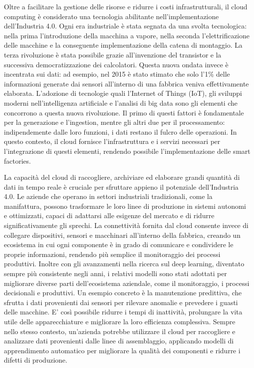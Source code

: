 Oltre a facilitare la gestione delle risorse e ridurre i costi infrastrutturali, il cloud computing è considerato una tecnologia abilitante nell'implementazione dell’Industria 4.0. Ogni era industriale è stata segnata da una svolta tecnologica: nella prima l'introduzione della macchina a vapore, nella seconda l'elettrificazione delle macchine e la conseguente implementazione della catena di montaggio. La terza rivoluzione è stata possibile grazie all'invenzione del transistor e la successiva democratizzazione dei calcolatori. Questa nuova ondata invece è incentrata sui dati: ad esempio, nel 2015 è stato stimato che solo l'1\% delle informazioni generate dai sensori all'interno di una fabbrica veniva effettivamente elaborata\cite{a6mckinsey}.  L’adozione di tecnologie quali l’Internet of Things (IoT), gli sviluppi moderni nell'intelligenza artificiale e l’analisi di big data sono gli elementi che concorrono a questa nuova rivoluzione. Il primo di questi fattori è fondamentale per la generazione e l'ingestion, mentre gli altri due per il processamento: indipendemente dalle loro funzioni, i dati restano il fulcro delle operazioni. In questo contesto, il cloud fornisce l'infrastruttura e i servizi necessari per l'integrazione di questi elementi, rendendo possibile l'implementazione delle smart factories. 

La capacità del cloud di raccogliere, archiviare ed elaborare grandi quantità di dati in tempo reale è cruciale per sfruttare appieno il potenziale dell’Industria 4.0. Le aziende che operano in settori industriali tradizionali, come la manifattura, possono trasformare le loro linee di produzione in sistemi autonomi e ottimizzati, capaci di adattarsi alle esigenze del mercato e di ridurre significativamente gli sprechi. La connettività fornita dal cloud consente invece di collegare dispositivi, sensori e macchinari all'interno della fabbrica, creando un ecosistema in cui ogni componente è in grado di comunicare e condividere le proprie informazioni, rendendo più semplice il monitoraggio dei processi produttivi. Inoltre con gli avanzamenti nella ricerca sul deep learning, diventato sempre più consistente negli anni, i relativi modelli sono stati adottati per migliorare diverse parti dell'ecosistema aziendale, come il monitoraggio, i processi decisionali e produttivi. Un esempio concreto è la manutenzione predittiva, che sfrutta i dati provenienti dai sensori per rilevare anomalie e prevedere i guasti delle macchine. E' così possibile ridurre i tempi di inattività, prolungare la vita utile delle apparecchiature e migliorare la loro efficienza complessiva. Sempre nello stesso contesto, un'azienda potrebbe utilizzare il cloud per raccogliere e analizzare dati provenienti dalle linee di assemblaggio, applicando modelli di apprendimento automatico per migliorare la qualità dei componenti e ridurre i difetti di produzione. 

